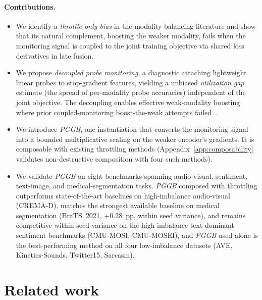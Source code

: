 \documentclass{article} %
\begin{document}
\paragraph{Contributions.}
\begin{itemize}
    \item We identify a \emph{throttle-only bias} in the modality-balancing literature and show that its natural complement, boosting the weaker modality, fails when the monitoring signal is coupled to the joint training objective via shared loss derivatives in late fusion.

    \item We propose \emph{decoupled probe monitoring}, a diagnostic attaching lightweight linear probes to stop-gradient features, yielding a unbiased \emph{utilization gap} estimate (the spread of per-modality probe accuracies) independent of the joint objective. The decoupling enables effective weak-modality boosting where prior coupled-monitoring boost-the-weak attempts failed~\citep{wei2024opm}.

    \item We introduce \emph{PGGB}, one instantiation that converts the monitoring signal into a bounded multiplicative scaling on the weaker encoder's gradients. It is composable with existing throttling methods (Appendix~\ref{app:composability} validates non-destructive composition with four such methods).

    \item We validate \emph{PGGB} on eight benchmarks spanning audio-visual, sentiment, text-image, and medical-segmentation tasks. \emph{PGGB} composed with throttling outperforms state-of-the-art baselines on high-imbalance audio-visual (CREMA-D), matches the strongest available baseline on medical segmentation (BraTS~2021, $+0.28$~pp, within seed variance), and remains competitive within seed variance on the high-imbalance text-dominant sentiment benchmarks (CMU-MOSI, CMU-MOSEI), and \emph{PGGB} used alone is the best-performing method on all four low-imbalance datasets (AVE, Kinetics-Sounds, Twitter15, Sarcasm).
\end{itemize}


\section{Related work}
\label{sec:related}
\end{document}
